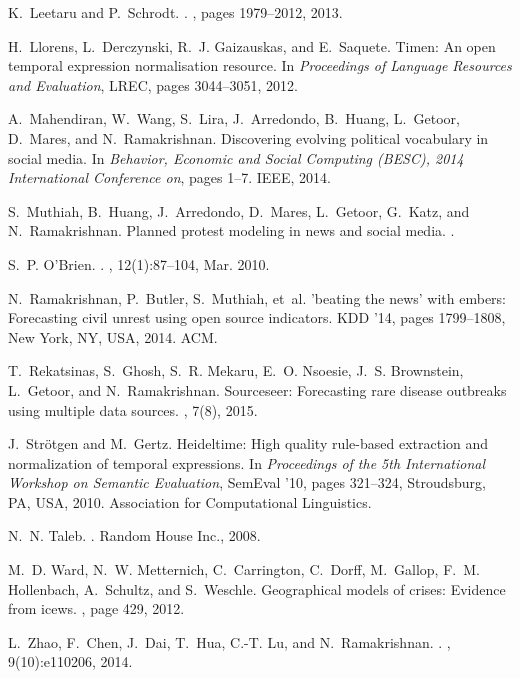 \documentclass[11pt,a4paper,extrafontsizes,oneside]{article}
\begin{document}
\begin{thebibliography}{10}
K.~Leetaru and P.~Schrodt.
.
, pages 1979--2012, 2013.

H.~Llorens, L.~Derczynski, R.~J. Gaizauskas, and E.~Saquete.
\newblock Timen: An open temporal expression normalisation resource.
\newblock In {\em Proceedings of Language Resources and Evaluation}, LREC,
  pages 3044--3051, 2012.

A.~Mahendiran, W.~Wang, S.~Lira, J.~Arredondo, B.~Huang, L.~Getoor, D.~Mares,
  and N.~Ramakrishnan.
\newblock Discovering evolving political vocabulary in social media.
\newblock In {\em Behavior, Economic and Social Computing (BESC), 2014
  International Conference on}, pages 1--7. IEEE, 2014.

S.~Muthiah, B.~Huang, J.~Arredondo, D.~Mares, L.~Getoor, G.~Katz, and
  N.~Ramakrishnan.
\newblock Planned protest modeling in news and social media.
.

S.~P. O’Brien.
.
, 12(1):87--104, Mar. 2010.

N.~Ramakrishnan, P.~Butler, S.~Muthiah, et~al.
\newblock 'beating the news' with embers: Forecasting civil unrest using open
  source indicators.
\newblock KDD '14, pages 1799--1808, New York, NY, USA, 2014. ACM.

T.~Rekatsinas, S.~Ghosh, S.~R. Mekaru, E.~O. Nsoesie, J.~S. Brownstein,
  L.~Getoor, and N.~Ramakrishnan.
\newblock Sourceseer: Forecasting rare disease outbreaks using multiple data
  sources.
, 7(8), 2015.

J.~Str\"{o}tgen and M.~Gertz.
\newblock Heideltime: High quality rule-based extraction and normalization of
  temporal expressions.
\newblock In {\em Proceedings of the 5th International Workshop on Semantic
  Evaluation}, SemEval '10, pages 321--324, Stroudsburg, PA, USA, 2010.
  Association for Computational Linguistics.

N.~N. Taleb.
.
\newblock Random House Inc., 2008.

M.~D. Ward, N.~W. Metternich, C.~Carrington, C.~Dorff, M.~Gallop, F.~M.
  Hollenbach, A.~Schultz, and S.~Weschle.
\newblock Geographical models of crises: Evidence from icews.
, page 429,
  2012.

L.~Zhao, F.~Chen, J.~Dai, T.~Hua, C.-T. Lu, and N.~Ramakrishnan.
.
, 9(10):e110206, 2014.

\end{thebibliography}
\end{document}
